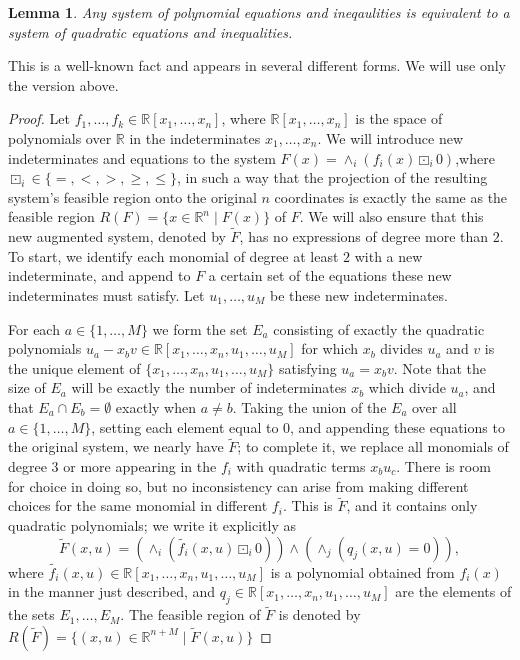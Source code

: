 \documentclass[11pt]{article} %
\newtheorem{lem}[thm]{Lemma}
\newcommand{\R}{\mathbb{R}}
\begin{document}
\begin{lem}
Any system of polynomial equations and ineqaulities is equivalent to a system of quadratic equations and inequalities.
\label{ReduceQuadratic}
\end{lem}
This is a well-known fact and appears in several different forms. We will use only the version above.
\begin{proof}
Let $f_1,\ldots,f_k \in \R[x_1,\ldots,x_n]$, where $\R[x_1,\ldots,x_n]$ is the space of polynomials over $\R$ in the indeterminates $x_1,\ldots,x_n$.  We will introduce new indeterminates and equations to the system $F(x)=\wedge_i (f_i(x)\boxdot_i 0)$,where $\boxdot_i \in \{=,<,>,\geq,\leq\}$, in such a way that the projection of the resulting system's feasible region onto the original $n$ coordinates is exactly the same as the feasible region $R(F)=\{x \in \R^n \mid F(x)\}$ of $F$. We will also ensure that this new augmented system, denoted by $\tilde{F}$, has no expressions of degree more than $2$. To start, we identify each monomial of degree at least $2$ with a new indeterminate, and append to $F$ a certain set of the equations these new indeterminates must satisfy. Let $u_1,\ldots, u_M$ be these new indeterminates.

For each $a \in \{1,\ldots,M\}$  we form the set $E_a$ consisting of exactly the quadratic polynomials $u_a - x_bv \in \R[x_1,\ldots,x_n,u_1,\ldots,u_M]$ for which $x_b$ divides $u_a$ and $v$ is the unique element of $\{x_1,\ldots,x_n,u_1,\ldots,u_M\}$ satisfying $u_a = x_bv$. Note that the size of $E_a$ will be exactly the number of indeterminates $x_b$ which divide $u_a$, and that $E_a\cap E_b = \emptyset$ exactly when $a\neq b$. Taking the union of the $E_a$ over all $a \in \{1,\ldots,M\}$, setting each element equal to $0$, and appending these equations to the original system, we nearly have $\tilde{F}$; to complete it, we replace all monomials of degree $3$ or more appearing in the $f_i$ with quadratic terms $x_bu_c$. There is room for choice in doing so, but no inconsistency can arise from making different choices for the same monomial in different $f_i$.  This is $\tilde{F}$, and it contains only quadratic polynomials; we write it explicitly as
\[\tilde{F}(x,u) =   (\wedge_i (\tilde{f_i}(x,u)\boxdot_i 0)) \wedge (\wedge_j(q_j(x,u) = 0)),           \]
where $\tilde{f_i}(x,u) \in \R[x_1,\ldots,x_n,u_1,\ldots,u_M]$ is a polynomial obtained from $f_i(x)$ in the manner just described, and $q_j \in \R[x_1,\ldots,x_n,u_1,\ldots,u_M]$ are the elements of the sets $E_1, \ldots, E_M$. The feasible region of $\tilde{F}$ is denoted by $R(\tilde{F}) = \{(x,u) \in \R^{n+M} \mid \tilde{F}(x,u)\}$


\end{proof}
\end{document}
